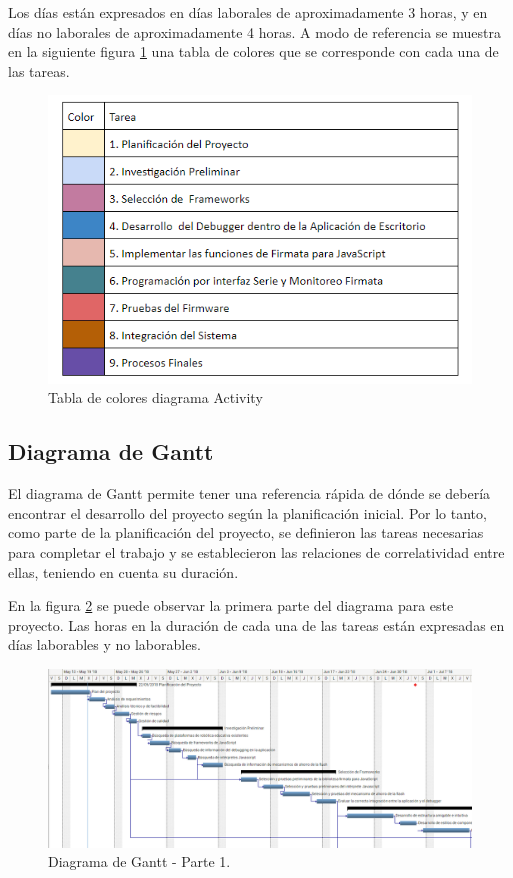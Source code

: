 Los días están expresados en días laborales de aproximadamente 3 horas, y en días no laborales de aproximadamente 4 horas. 
A modo de referencia se muestra en la siguiente figura  \ref{fig:tablaColores} una tabla de colores que se corresponde con cada una de las tareas.

\begin{figure}[h]
	\centering
	\includegraphics[width=12cm]{./Figures/tablaColores.png}
	\caption{Tabla de colores diagrama Activity}
	\label{fig:tablaColores}
\end{figure}

\subsection{Diagrama de Gantt}

El diagrama de Gantt permite tener una referencia rápida de dónde se debería encontrar el desarrollo del proyecto según la planificación inicial.
Por lo tanto, como parte de la planificación del proyecto, se definieron las tareas necesarias para completar el trabajo y se establecieron las relaciones de correlatividad entre ellas, teniendo en cuenta su duración. 

En la figura \ref{fig:diagramaGanttPrimeraParte} se puede observar la primera parte del diagrama para este proyecto. Las horas en la duración de cada una de las tareas están expresadas en días laborables y no laborables.

\begin{figure}[h]
	\centering
	\includegraphics[scale=.30]{./Figures/diagramaGanttPrimeraParte.png}
	\caption{Diagrama de Gantt - Parte 1.}
	\label{fig:diagramaGanttPrimeraParte}
\end{figure}

